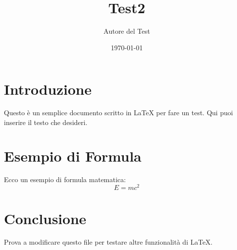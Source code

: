 \documentclass[a4paper,12pt]{article}
\title{Test2}
\author{Autore del Test}
\date{\today} %
\begin{document}
\maketitle

\section{Introduzione}
Questo è un semplice documento scritto in \LaTeX{} per fare un test. Qui puoi inserire il testo che desideri.

\section{Esempio di Formula}
Ecco un esempio di formula matematica:
\[
E = mc^2
\]

\section{Conclusione}
Prova a modificare questo file per testare altre funzionalità di \LaTeX.
\end{document}
